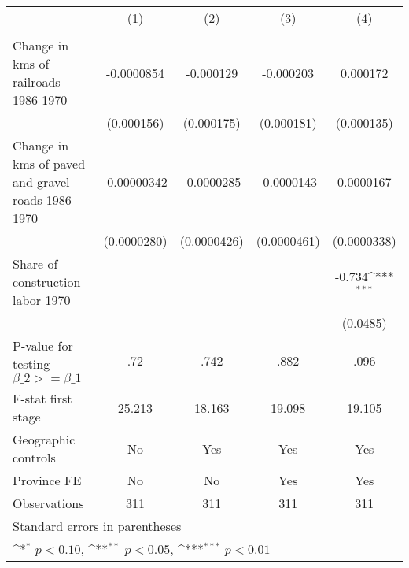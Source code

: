 {
\def\sym#1{\ifmmode^{#1}\else\(^{#1}\)\fi}
\begin{tabular}{l*{4}{c}}
\hline\hline
                &\multicolumn{1}{c}{(1)}&\multicolumn{1}{c}{(2)}&\multicolumn{1}{c}{(3)}&\multicolumn{1}{c}{(4)}\\
                &\multicolumn{1}{c}{}&\multicolumn{1}{c}{}&\multicolumn{1}{c}{}&\multicolumn{1}{c}{}\\
\hline
Change in kms of railroads 1986-1970&-0.0000854         &-0.000129         &-0.000203         & 0.000172         \\
                &(0.000156)         &(0.000175)         &(0.000181)         &(0.000135)         \\
[1em]
Change in kms of paved and gravel roads 1986-1970&-0.00000342         &-0.0000285         &-0.0000143         &0.0000167         \\
                &(0.0000280)         &(0.0000426)         &(0.0000461)         &(0.0000338)         \\
[1em]
Share of construction labor 1970&                  &                  &                  &   -0.734\sym{***}\\
                &                  &                  &                  & (0.0485)         \\
\hline
P-value for testing $\beta\_{2} >= \beta\_{1}$&      .72         &     .742         &     .882         &     .096         \\
F-stat first stage&   25.213         &   18.163         &   19.098         &   19.105         \\
Geographic controls&       No         &      Yes         &      Yes         &      Yes         \\
Province FE     &       No         &       No         &      Yes         &      Yes         \\
Observations    &      311         &      311         &      311         &      311         \\
\hline\hline
\multicolumn{5}{l}{\footnotesize Standard errors in parentheses}\\
\multicolumn{5}{l}{\footnotesize \sym{*} \(p<0.10\), \sym{**} \(p<0.05\), \sym{***} \(p<0.01\)}\\
\end{tabular}
}
